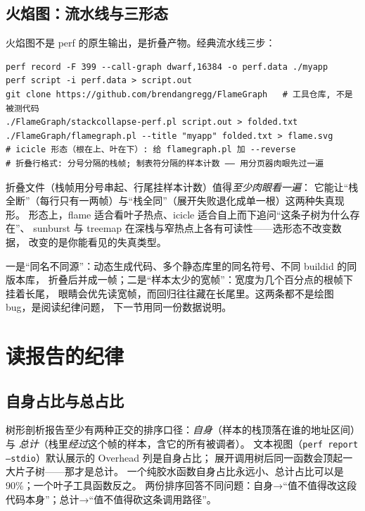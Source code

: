 \documentclass[12pt,a4paper,fontset=fandol]{ctexbook}
\newcommand{\Tp}[1]{\texttt{#1}}
\begin{document}
\subsection{火焰图：流水线与三形态}

火焰图不是 perf 的原生输出，是折叠产物。经典流水线三步：

\begin{lstlisting}[style=shellstyle, caption={perf 到火焰图的标准折叠流水线。最后一步换参数即得 icicle 形态；sunburst 与 treemap 由同生态的其他脚本或工具生成，可用性需按你所用版本自查。}, label={lst:pm04-flame}]
perf record -F 399 --call-graph dwarf,16384 -o perf.data ./myapp
perf script -i perf.data > script.out
git clone https://github.com/brendangregg/FlameGraph   # 工具仓库, 不是被测代码
./FlameGraph/stackcollapse-perf.pl script.out > folded.txt
./FlameGraph/flamegraph.pl --title "myapp" folded.txt > flame.svg
# icicle 形态（根在上、叶在下）: 给 flamegraph.pl 加 --reverse
# 折叠行格式: 分号分隔的栈帧; 制表符分隔的样本计数 —— 用分页器肉眼先过一遍
\end{lstlisting}

折叠文件（栈帧用分号串起、行尾挂样本计数）值得\emph{至少肉眼看一遍}：
它能让``栈全断''（每行只有一两帧）与``栈全同''（展开失败退化成单一根）这两种失真现形。
形态上，flame 适合看叶子热点、icicle 适合自上而下追问``这条子树为什么存在''、
sunburst 与 treemap 在深栈与窄热点上各有可读性——选形态不改变数据，
改变的是你能看见的失真类型。

\begin{note}[title={折叠与去重的两个口径陷阱}]
一是``同名不同源''：动态生成代码、多个静态库里的同名符号、不同 buildid 的同版本库，
折叠后并成一帧；二是``样本太少的宽帧''：宽度为几个百分点的根帧下挂着长尾，
眼睛会优先读宽帧，而回归往往藏在长尾里。这两条都不是绘图 bug，是阅读纪律问题，
下一节用同一份数据说明。
\end{note}

\section{读报告的纪律}
\label{sec:pm04-report}

\subsection{自身占比与总占比}

树形剖析报告至少有两种正交的排序口径：\emph{自身}（样本的栈顶落在谁的地址区间）与
\emph{总计}（栈里\emph{经过}这个帧的样本，含它的所有被调者）。
文本视图（\Tp{perf report --stdio}）默认展示的 Overhead 列是自身占比；
展开调用树后同一函数会顶起一大片子树——那才是总计。
一个纯胶水函数自身占比永远小、总计占比可以是 90\%；一个叶子工具函数反之。
两份排序回答不同问题：自身→``值不值得改这段代码本身''；总计→``值不值得砍这条调用路径''。
\end{document}
